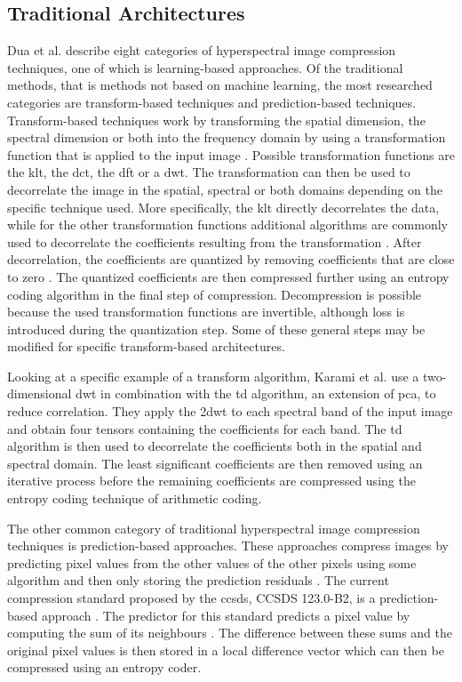 \subsection{Traditional Architectures}
Dua et al. \citep{dua_comprehensive_2020} describe eight categories of hyperspectral image compression techniques, one of which is learning-based approaches. Of the traditional methods, that is methods not based on machine learning, the most researched categories are transform-based techniques and prediction-based techniques. Transform-based techniques work by transforming the spatial dimension, the spectral dimension or both into the frequency domain by using a transformation function that is applied to the input image \citep{dua_comprehensive_2020}. Possible transformation functions are the \ac{klt}, the \ac{dct}, the \ac{dft} or a \ac{dwt}. The transformation can then be used to decorrelate the image in the spatial, spectral or both domains depending on the specific technique used. More specifically, the \ac{klt} directly decorrelates the data, while for the other transformation functions additional algorithms are commonly used to decorrelate the coefficients resulting from the transformation \citep{saghri_adaptive_2010,karami_compression_2012}. After decorrelation, the coefficients are quantized by removing coefficients that are close to zero \citep{dua_comprehensive_2020}. The quantized coefficients are then compressed further using an entropy coding algorithm in the final step of compression. Decompression is possible because the used transformation functions are invertible, although loss is introduced during the quantization step. Some of these general steps may be modified for specific transform-based architectures.

Looking at a specific example of a transform algorithm, Karami et al. \citep{karami_compression_2012} use a two-dimensional \ac{dwt} in combination with the \ac{td} algorithm, an extension of \ac{pca}, to reduce correlation. They apply the 2\ac{dwt} to each spectral band of the input image and obtain four tensors containing the coefficients for each band. The \ac{td} algorithm is then used to decorrelate the coefficients both in the spatial and spectral domain. The least significant coefficients are then removed using an iterative process before the remaining coefficients are compressed using the entropy coding technique of arithmetic coding.

The other common category of traditional hyperspectral image compression techniques is prediction-based approaches. These approaches compress images by predicting pixel values from the other values of the other pixels using some algorithm and then only storing the prediction residuals \citep{dua_comprehensive_2020,conoscenti_constant_2016}. The current compression standard proposed by the \ac{ccsds}, CCSDS 123.0-B2, is a prediction-based approach \citep{hernandez-cabronero_ccsds_2021}. The predictor for this standard predicts a pixel value by computing the sum of its neighbours \citep{conoscenti_constant_2016}. The difference between these sums and the original pixel values is then stored in a local difference vector which can then be compressed using an entropy coder.
